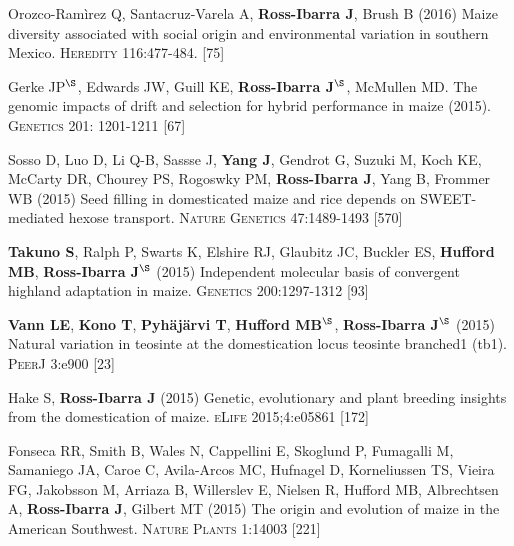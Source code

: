 \documentclass[letterpaper,10pt]{article}
\begin{document}
\begin{etaremune}
\item Orozco-Ram\`{i}rez Q, Santacruz-Varela A, {\bf Ross-Ibarra J}, Brush B (2016) Maize diversity associated with social origin and environmental variation in southern Mexico. \textsc{Heredity} 116:477-484.
{} [75]\\


\item Gerke JP$^\S$, Edwards JW, Guill KE, {\bf Ross-Ibarra J}$^\S$, McMullen MD.  The genomic impacts of drift and selection for hybrid performance in maize (2015). \textsc{Genetics}  201: 1201-1211
{} [67]\\


\item Sosso D, Luo D, Li Q-B, Sassse J, {\bf Yang J}, Gendrot G, Suzuki M, Koch KE, McCarty DR, Chourey PS, Rogoswky PM, {\bf Ross-Ibarra J}, Yang B, Frommer WB (2015) Seed filling in domesticated maize and rice depends on SWEET-mediated hexose transport. \textsc{Nature Genetics} 47:1489-1493
{} [570]\\


\item {\bf Takuno S}, Ralph P, Swarts K, Elshire RJ, Glaubitz JC, Buckler ES, {\bf Hufford MB}, {\bf Ross-Ibarra J}$^\S$ (2015) Independent molecular basis of convergent highland adaptation in maize. \textsc{Genetics} 200:1297-1312
{} [93]\\


\item {\bf Vann LE}, {\bf Kono T}, {\bf Pyh\"aj\"arvi T}, {\bf Hufford MB}$^\S$, {\bf Ross-Ibarra J}$^\S$ (2015) Natural variation in teosinte at the domestication locus teosinte branched1 (tb1). \textsc{PeerJ} 3:e900
{} [23]\\


\item Hake S, {\bf Ross-Ibarra J} (2015) Genetic, evolutionary and plant breeding insights from the domestication of maize. \textsc{eLife}  2015;4:e05861
{} [172]\\


\item Fonseca RR, Smith B, Wales N, Cappellini E, Skoglund P, Fumagalli M, Samaniego JA, Caroe C, Avila-Arcos MC, Hufnagel D, Korneliussen TS, Vieira FG, Jakobsson M, Arriaza B, Willerslev E, Nielsen R, Hufford MB, Albrechtsen A,  {\bf Ross-Ibarra J}, Gilbert MT (2015) The origin and evolution of maize in the American Southwest. \textsc{Nature Plants} 1:14003
{} [221]\\


\end{etaremune}
\end{document}
